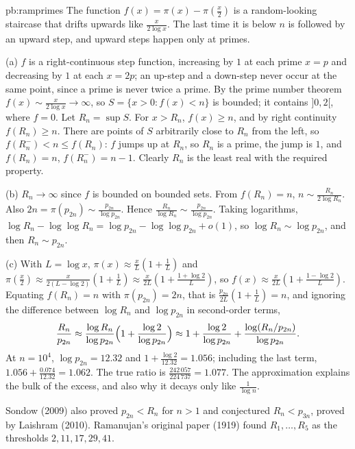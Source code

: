 \begin{solution}{pb:ramprimes}
\idea The function $f(x)=\pi(x)-\pi(\frac x2)$ is a random-looking staircase that drifts upwards like $\frac x{2\log x}$. The last time it is below $n$ is followed by an upward
step, and upward steps happen only at primes.

\writeup (a) $f$ is a right-continuous step function, increasing by $1$ at each prime $x=p$ and decreasing by $1$ at each $x=2p$; an up-step and a down-step never occur at the same
point, since a prime is never twice a prime. By the prime number theorem $f(x)\sim\frac x{2\log x}\to\infty$, so $S=\{x>0:f(x)<n\}$ is bounded;
it contains $]0,2[$, where $f=0$. Let $R_n=\sup S$. For $x>R_n$, $f(x)\ge n$, and by right continuity $f(R_n)\ge n$. There are points of $S$ arbitrarily close to $R_n$ from the
left, so $f(R_n^-)<n\le f(R_n)$: $f$ jumps up at $R_n$, so $R_n$ is a prime, the jump is $1$, and $f(R_n)=n$, $f(R_n^-)=n-1$. Clearly $R_n$ is the least real with the required property.

(b) $R_n\to\infty$ since $f$ is bounded on bounded sets. From $f(R_n)=n$, $n\sim\frac{R_n}{2\log R_n}$. Also $2n=\pi(p_{2n})\sim\frac{p_{2n}}{\log p_{2n}}$. Hence
$\frac{R_n}{\log R_n}\sim\frac{p_{2n}}{\log p_{2n}}$. Taking logarithms, $\log R_n-\log\log R_n=\log p_{2n}-\log\log p_{2n}+o(1)$, so $\log R_n\sim\log p_{2n}$, and then
$R_n\sim p_{2n}$.

(c) With $L=\log x$, $\pi(x)\approx\frac xL(1+\frac1L)$ and $\pi(\frac x2)\approx\frac x{2(L-\log2)}(1+\frac1L)\approx\frac x{2L}(1+\frac{1+\log2}L)$, so
$f(x)\approx\frac x{2L}(1+\frac{1-\log2}L)$. Equating $f(R_n)=n$ with $\pi(p_{2n})=2n$, that is $\frac{p_{2n}}{2L}(1+\frac1L)=n$, and ignoring the difference between $\log R_n$ and $\log p_{2n}$
in second-order terms,
\[
\frac{R_n}{p_{2n}}\approx\frac{\log R_n}{\log p_{2n}}\Bigl(1+\frac{\log2}{\log p_{2n}}\Bigr)\approx1+\frac{\log2}{\log p_{2n}}+\frac{\log(R_n/p_{2n})}{\log p_{2n}}.
\]
At $n=10^4$, $\log p_{2n}=12.32$ and $1+\frac{\log2}{12.32}=1.056$; including the last term, $1.056+\frac{0.074}{12.32}=1.062$. The true ratio is $\frac{242\,057}{224\,737}=1.077$. The
approximation explains the bulk of the excess, and also why it decays only like $\frac1{\log n}$.

\leads Sondow (2009) also proved $p_{2n}<R_n$ for $n>1$ and conjectured $R_n<p_{3n}$, proved by Laishram (2010). Ramanujan's original paper (1919) found $R_1,\dots,R_5$ as the thresholds $2,11,17,29,41$.
\end{solution}


